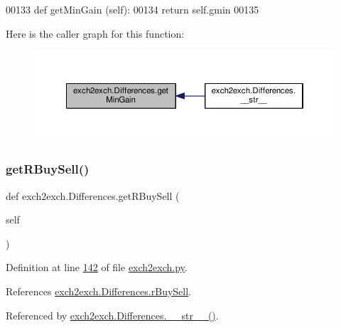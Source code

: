 \begin{DoxyCode}
00133     \textcolor{keyword}{def }getMinGain (self):
00134         \textcolor{keywordflow}{return} self.gmin
00135         
\end{DoxyCode}
Here is the caller graph for this function\+:
\nopagebreak
\begin{figure}[H]
\begin{center}
\leavevmode
\includegraphics[width=350pt]{classexch2exch_1_1_differences_a110cb3a79f744b6d3911b6669b8a0a89_icgraph}
\end{center}
\end{figure}
\mbox{\label{classexch2exch_1_1_differences_ae360dc9692075e21d0aafa2ff1dc23d4}} 
\subsubsection{\texorpdfstring{get\+R\+Buy\+Sell()}{getRBuySell()}}
{\footnotesize\ttfamily def exch2exch.\+Differences.\+get\+R\+Buy\+Sell (\begin{DoxyParamCaption}\item[{}]{self }\end{DoxyParamCaption})}



Definition at line \hyperlink{exch2exch_8py_source_l00142}{142} of file \hyperlink{exch2exch_8py_source}{exch2exch.\+py}.



References \hyperlink{exch2exch_8py_source_l00122}{exch2exch.\+Differences.\+r\+Buy\+Sell}.



Referenced by \hyperlink{exch2exch_8py_source_l00154}{exch2exch.\+Differences.\+\_\+\+\_\+str\+\_\+\+\_\+()}.


